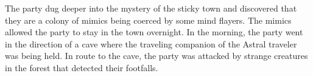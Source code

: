The party dug deeper into the mystery of the sticky town and discovered that they are a colony of mimics being coerced by some mind flayers.
The mimics allowed the party to stay in the town overnight.
In the morning, the party went in the direction of a cave where the traveling companion of the Astral traveler was being held.
In route to the cave, the party was attacked by strange creatures in the forest that detected their footfalls.